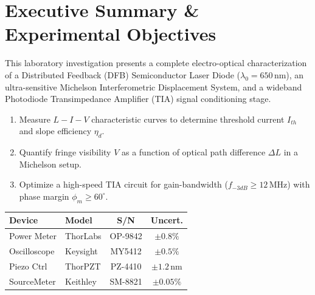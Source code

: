 \documentclass[11pt,a4paper,parskip=half,headsepline=0.6pt,footsepline=0.4pt]{scrartcl}
\begin{document}
\vspace{1pt}

\section{Executive Summary \& Experimental Objectives}

This laboratory investigation presents a complete electro-optical characterization of a Distributed Feedback (DFB) Semiconductor Laser Diode ($\lambda_0 = 650\,\text{nm}$), an ultra-sensitive Michelson Interferometric Displacement System, and a wideband Photodiode Transimpedance Amplifier (TIA) signal conditioning stage.

\vspace{1pt}

\begin{minipage}[t]{0.48\linewidth}
  \begin{tcolorbox}[accentcard, title={\small \textcolor{navyprimary}{\faBullseye\ Key Experimental Objectives}}, colframe=navyprimary!40]
    \small
    \begin{enumerate}[leftmargin=1.2em, itemsep=1pt, topsep=1pt]
      \item Measure $L-I-V$ characteristic curves to determine threshold current $I_{th}$ and slope efficiency $\eta_d$.
      \item Quantify fringe visibility $V$ as a function of optical path difference $\Delta L$ in a Michelson setup.
      \item Optimize a high-speed TIA circuit for gain-bandwidth ($f_{-3dB} \ge 12\,\text{MHz}$) with phase margin $\phi_m \ge 60^\circ$.
    \end{enumerate}
  \end{tcolorbox}
\end{minipage}%
\hfill
\begin{minipage}[t]{0.48\linewidth}
  \begin{tcolorbox}[accentcard, title={\small \textcolor{navyprimary}{\faSlidersH\ Calibrated Test Instruments}}, colframe=navyprimary!40]
    \small
    \begin{tabularx}{\linewidth}{>{\raggedright\arraybackslash}X l c c}
      \toprule
      \textbf{Device} & \textbf{Model} & \textbf{S/N} & \textbf{Uncert.} \\
      \midrule
      Power Meter & ThorLabs & OP-9842 & $\pm 0.8\%$ \\
      Oscilloscope & Keysight & MY5412 & $\pm 0.5\%$ \\
      Piezo Ctrl & ThorPZT & PZ-4410 & $\pm 1.2\,\text{nm}$ \\
      SourceMeter & Keithley & SM-8821 & $\pm 0.05\%$ \\
      \bottomrule
    \end{tabularx}
  \end{tcolorbox}
\end{minipage}
\end{document}
